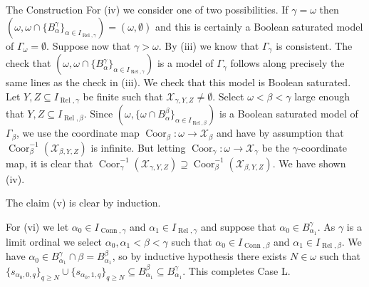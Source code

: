 \documentclass{amsart}
\theoremstyle{definition}\newtheorem{theorem}{Theorem}
\theoremstyle{definition}\newtheorem{bigtheorem}{Theorem}
\numberwithin{theorem}{section}
\theoremstyle{definition}\newtheorem{corollary}[theorem]{Corollary}
\theoremstyle{definition}\newtheorem{proposition}[theorem]{Proposition}
\theoremstyle{definition}\newtheorem{definition}[theorem]{Definition}
\theoremstyle{definition}\newtheorem{question}[theorem]{Question}
\theoremstyle{definition}\newtheorem{example}[theorem]{Example}
\theoremstyle{definition}\newtheorem{remark}[theorem]{Remark}
\theoremstyle{definition}\newtheorem{note}[theorem]{Note}
\theoremstyle{definition}\newtheorem{lemma}[theorem]{Lemma}
\theoremstyle{definition}\newtheorem{fact}[theorem]{Fact}
\theoremstyle{definition}\newtheorem{define}[theorem]{Definition}
\theoremstyle{definition}\newtheorem{definitions}[theorem]{Definitions}
\theoremstyle{definition}\newtheorem{claim}[theorem]{Claim}
\theoremstyle{definition}\newtheorem{obs}[theorem]{Observation}
\theoremstyle{definition}\newtheorem{construction}[theorem]{Construction}
\newcommand{\Rel}{\operatorname{Rel}}
\newcommand{\X}{\mathcal{X}}
\newcommand{\Coor}{\operatorname{Coor}}
\newcommand{\Conn}{\operatorname{Conn}}
\begin{document}
\begin{section}{The Construction}
For (iv) we consider one of two possibilities.  If $\gamma = \omega$ then $(\omega, \omega \cap\{B_{\alpha}^{\gamma}\}_{\alpha \in I_{\Rel, \gamma}}) = (\omega, \emptyset)$ and this is certainly a Boolean saturated model of $\Gamma_{\omega} = \emptyset$.  Suppose now that $\gamma > \omega$.  By (iii) we know that $\Gamma_{\gamma}$ is consistent.  The check that $(\omega, \omega \cap\{B_{\alpha}^{\gamma}\}_{\alpha \in I_{\Rel, \gamma}})$ is a model of $\Gamma_{\gamma}$ follows along precisely the same lines as the check in (iii).  We check that this model is Boolean saturated.  Let $Y, Z \subseteq I_{\Rel, \gamma}$ be finite such that $\X_{\gamma, Y, Z} \neq \emptyset$.  Select $\omega < \beta < \gamma$ large enough that $Y, Z \subseteq I_{\Rel, \beta}$.  Since $(\omega, \{\omega \cap B_{\alpha}^{\beta}\}_{\alpha \in I_{\Rel, \beta}})$ is a Boolean saturated model of $\Gamma_{\beta}$, we use the coordinate map $\Coor_{\beta}: \omega \rightarrow \X_{\beta}$ and have by assumption that $\Coor_{\beta}^{-1}(\X_{\beta, Y, Z})$ is infinite.  But letting $\Coor_{\gamma}: \omega \rightarrow \X_{\gamma}$ be the $\gamma$-coordinate map, it is clear that $\Coor_{\gamma}^{-1}(\X_{\gamma, Y, Z}) \supseteq \Coor_{\beta}^{-1}(\X_{\beta, Y, Z})$.  We have shown (iv).

The claim (v) is clear by induction.

For (vi) we let $\alpha_0 \in I_{\Conn, \gamma}$ and $\alpha_1 \in I_{\Rel, \gamma}$ and suppose that $\alpha_0 \in B_{\alpha_1}^{\gamma}$.  As $\gamma$ is a limit ordinal we select $\alpha_0, \alpha_1 < \beta < \gamma$ such that $\alpha_0 \in I_{\Conn, \beta}$ and $\alpha_1 \in I_{\Rel, \beta}$.  We have $\alpha_0 \in B_{\alpha_1}^{\gamma} \cap \beta = B_{\alpha_1}^{\beta}$, so by inductive hypothesis there exists $N\in \omega$ such that $\{s_{\alpha_0, 0, q}\}_{q \geq N} \cup \{s_{\alpha_0, 1, q}\}_{q \geq N} \subseteq B_{\alpha_1}^{\beta} \subseteq B_{\alpha_1}^{\gamma}$.  This completes Case L.
































\end{section}
\end{document}
